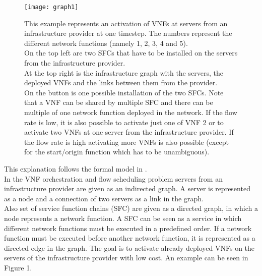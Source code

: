 \begin{figure*}[t]
\label{fig:graph}
\centering
\texttt{[image: graph1]}
\caption{This example represents an activation of VNFs at servers from an infrastructure provider at one timestep. The numbers represent the different network functions (namely 1, 2, 3, 4 and 5).\\ On the top left are two SFCs that have to be installed on the servers from the infrastructure provider.\\ At the top right is the infrastructure graph with the servers, the deployed VNFs and the links between them from the provider. \\ On the button is one possible installation of the two SFCs. Note that a VNF can be shared by multiple SFC and there can be multiple of one network function deployed in the network. If the flow rate is low, it is also possible to activate just one of VNF 2 or to activate two VNFs at one server from the infrastructure provider. If the flow rate is high activating more VNFs is also possible (except for the start/origin function which has to be unambiguous).}
\end{figure*}

This explanation follows the formal model in \cite{Gu}.\\
In the VNF orchestration and flow scheduling problem servers from an infrastructure provider are given as an indirected graph. A server is represented as a node and a connection of two servers as a link in the graph.\\
 Also set of service function chains (SFC) are given as a directed graph, in which a node represents a network function. A SFC can be seen as a service in which different network functions must be executed in a predefined order. If a network function must be executed before another network function, it is represented as a directed edge in the graph. The goal is to activate already deployed VNFs on the servers of the infrastructure provider with low cost. An example can be seen in Figure 1.\\%


